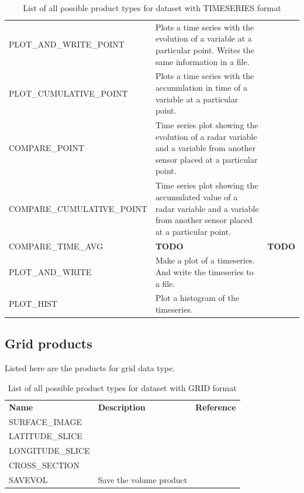 \documentclass[a4paper,11pt,pdftex,twoside]{scrartcl}
\renewcommand{\bf}{\normalfont \bfseries}
\begin{document}
{{{\begin{table}[H]
\begin{tabularx}{\textwidth}{lXl}
PLOT\_AND\_WRITE\_POINT    & Plots a time series with the evolution of a variable at a particular point. Writes the same information in a file. & \\
PLOT\_CUMULATIVE\_POINT    & Plots a time series with the accumulation in time of a variable at a particular point.  & \\
COMPARE\_POINT             & Time series plot showing the evolution of a radar variable and a variable from another sensor placed at a particular point. & \\
COMPARE\_CUMULATIVE\_POINT & Time series plot showing the accumulated value of a radar variable and a variable from another sensor placed at a particular point. & \\
COMPARE\_TIME\_AVG & {\bf TODO} & {\bf TODO} \\
PLOT\_AND\_WRITE           & Make a plot of a timeseries. And write
                             the timeseries to a file.              & \\
PLOT\_HIST           & Plot a histogram of the timeseries.  & \\                             
\end{tabularx}
\caption{List of all possible product types for dataset with TIMESERIES format}
\label{tab_products_TIMESERIES}
\end{table}

\subsection{Grid products}
Listed here are the products for grid data type.

\begin{table}[H]
\begin{tabularx}{\textwidth}{lXl}
{\bf Name} & {\bf Description} & {\bf Reference}\\

SURFACE\_IMAGE    &  &  \\
LATITUDE\_SLICE &  & \\
LONGITUDE\_SLICE &  & \\
CROSS\_SECTION &  & \\
SAVEVOL & Save the volume product & \\

                 
\end{tabularx}
\caption{List of all possible product types for dataset with GRID format}
\label{tab_products_GRID}
\end{table}

}}}
\end{document}
